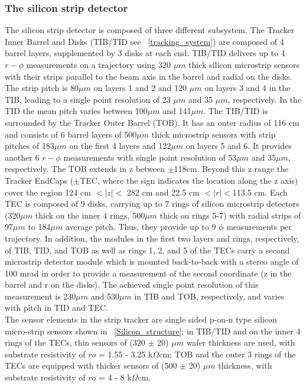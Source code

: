 \subsubsection{The silicon strip detector}
The silicon strip detector is composed of three different subsystem. The Tracker Inner Barrel and Disks (TIB/TID  see \figurename~\ref{tracking_system}) are composed of 4 barrel layers, supplemented by 3 disks at each end. TIB/TID delivers up to 4 $r-\phi$ measurements on a trajectory using 320 $\mu m$ thick silicon microstrip sensors with their strips parallel to the beam axis in the barrel and radial on the disks. The strip pitch is 80$\mu m$ on layers 1 and 2 and 120 $\mu m$ on layers 3 and 4 in the TIB, leading to a single point resolution of 23 $\mu m$ and 35 $\mu m$, respectively. In the TID the mean pitch varies between 100$\mu m$ and 141$\mu m$. The TIB/TID is surrounded by the Tracker Outer Barrel (TOB). It has an outer radius of 116 cm and consists of 6 barrel layers of 500$\mu m$ thick microstrip sensors with strip pitches of 183$\mu m$ on the first 4 layers and 122$\mu m$ on layers 5 and 6. It provides another 6 $r-\phi$ measurements with single point resolution of 53$\mu m$ and 35$\mu m$, respectively. The TOB extends in z between $\pm$118cm. Beyond this z range the Tracker EndCaps ($\pm$TEC, where the sign indicates the location along the z axis) cover the region 124 cm $< |z| <$ 282 cm and 22.5 cm $< |r| < $113.5 cm. Each TEC is composed of 9 disks, carrying up to 7 rings of silicon microstrip detectors (320$\mu m$ thick on the inner 4 rings, 500$\mu m$ thick on rings 5-7) with radial strips of 97$\mu m$ to 184$\mu m$ average pitch. Thus, they provide up to 9 $\phi$ measurements per trajectory. In addition, the modules in the first two layers and rings, respectively, of TIB, TID, and TOB as well as rings 1, 2, and 5 of the TECs carry a second microstrip detector module which is mounted back-to-back with a stereo angle of 100 mrad in order to provide a measurement of the second coordinate (z in the barrel and r on the disks). The achieved single point resolution of this measurement is 230$\mu m$ and 530$\mu m$ in TIB and TOB, respectively, and varies with pitch in TID and TEC. \\
The sensor elements in the strip tracker are single sided p-on-n type silicon micro-strip sensors shown in \figurename~\ref{Silicon_structure}: in TIB/TID and on the inner 4 rings of the TECs, thin sensors of (320 $\pm$ 20) $\mu m$ wafer thickness are used, with substrate resistivity of $ro$ = 1.55 - 3.25 k$\Omega$cm; TOB and the outer 3 rings of the TECs are equipped with thicker sensors of (500 $\pm$ 20) $\mu m$ thickness, with substrate resistivity of $ro$ = 4 - 8 k$\Omega$cm. 
